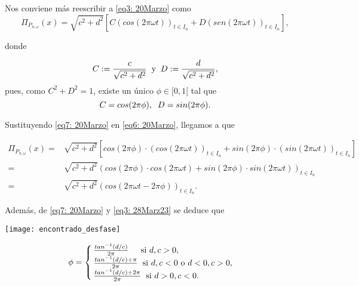 \noindent 
Nos conviene más reescribir a \eqref{eq3: 20Marzo} como
\begin{equation}
\label{eq6: 20Marzo}
\Pi_{P_{n, \omega}}(x)= 
\sqrt{c^{2}+d^{2}}
\left[
C (cos (2 \pi \omega t))_{t \in I_{n}} +
D (sen (2 \pi \omega t))_{t \in I_{n}} 
\right],
\end{equation}

\noindent 
donde

\begin{equation}
\label{eq3: 28Marz23}
C:= \frac{c}{\sqrt{c^{2}+d^{2}}} \hspace{0.2cm} \text{y}
\hspace{0.2cm} D:= \frac{d}{\sqrt{c^{2}+d^{2}}},
\end{equation}
\noindent 
pues, como $C^{2} + D^{2}=1$, existe un único
$\phi \in [0,1[$ tal que
\begin{equation}
\label{eq7: 20Marzo}
C= cos(2 \pi \phi), \hspace{0.2cm} 
D= sin(2 \pi \phi).
\end{equation}

\noindent 
Sustituyendo \eqref{eq7: 20Marzo} en \eqref{eq6: 20Marzo},
llegamos a que

\begin{align*}
\Pi_{P_{n, \omega}}(x) = & 
\sqrt{c^{2}+d^{2}} \left[
cos(2 \pi \phi) \cdot (cos (2 \pi \omega t))_{t \in I_{n}} +
sin(2 \pi \phi) \cdot (sin (2 \pi \omega t))_{t \in I_{n}} 
\right] \\
= & 
\sqrt{c^{2}+d^{2}} 
(cos(2 \pi \phi) \cdot cos (2 \pi \omega t) +
sin(2 \pi \phi) \cdot sin (2 \pi \omega t) )_{t \in I_{n}} \\
= & 
\sqrt{c^{2}+d^{2}} 
(cos(2 \pi \omega t - 2 \pi \phi))_{t \in I_{n}}.
\end{align*}

\noindent
Además, de \eqref{eq7: 20Marzo} y \eqref{eq3: 28Marz23}
se deduce que
\begin{marginfigure}
\texttt{[image: encontrado\_desfase]} 
\end{marginfigure}
\begin{equation}
\label{eq: desfase phi 1}
\phi =
\begin{cases}
\frac{tan^{-1}(d/c) }{2 \pi}  \hspace{0.4cm}    \text{   si }   d, c > 0,  \\
\frac{tan^{-1}(d/c) + \pi }{2 \pi} \hspace{0.2cm}  \text{si }  d, c < 0
\text{ o } d<0, c>0, \\
\frac{tan^{-1}(d/c) + 2\pi }{2 \pi} \hspace{0.2cm}  \text{si }  d>0,  c < 0. 
\end{cases}
\end{equation}


